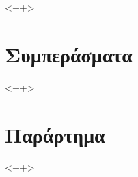 \documentclass[12pt]{article}
\begin{document}

<++>

\section{Συμπεράσματα}

<++>

\pagebreak
\renewcommand{\refname}{Βιβλιογραφία}
\begin{thebibliography}{00}
\end{thebibliography}

\pagebreak
\section{Παράρτημα}



<++>
\end{document}
